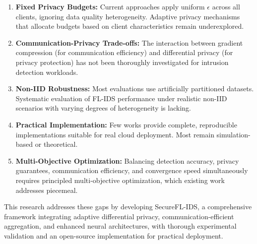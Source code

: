 \begin{enumerate}
    \item \textbf{Fixed Privacy Budgets:} Current approaches apply uniform $\epsilon$ across all clients, ignoring data quality heterogeneity. Adaptive privacy mechanisms that allocate budgets based on client characteristics remain underexplored.
    
    \item \textbf{Communication-Privacy Trade-offs:} The interaction between gradient compression (for communication efficiency) and differential privacy (for privacy protection) has not been thoroughly investigated for intrusion detection workloads.
    
    \item \textbf{Non-IID Robustness:} Most evaluations use artificially partitioned datasets. Systematic evaluation of FL-IDS performance under realistic non-IID scenarios with varying degrees of heterogeneity is lacking.
    
    \item \textbf{Practical Implementation:} Few works provide complete, reproducible implementations suitable for real cloud deployment. Most remain simulation-based or theoretical.
    
    \item \textbf{Multi-Objective Optimization:} Balancing detection accuracy, privacy guarantees, communication efficiency, and convergence speed simultaneously requires principled multi-objective optimization, which existing work addresses piecemeal.
\end{enumerate}

This research addresses these gaps by developing SecureFL-IDS, a comprehensive framework integrating adaptive differential privacy, communication-efficient aggregation, and enhanced neural architectures, with thorough experimental validation and an open-source implementation for practical deployment.
